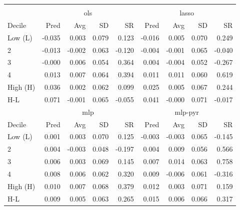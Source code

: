 \begin{tabular}{lrrrrrrrr}
\hline \hline \\ [-1.8ex]
 & \multicolumn{4}{c}{ols} & \multicolumn{4}{c}{lasso} \\
 \cmidrule(lr){2-5} \cmidrule(lr){6-9}
Decile & Pred & Avg & SD & SR & Pred & Avg & SD & SR \\
\midrule
Low (L) & -0.035 & 0.003 & 0.079 & 0.123 & -0.016 & 0.005 & 0.070 & 0.249 \\
2 & -0.013 & -0.002 & 0.063 & -0.120 & -0.004 & -0.001 & 0.065 & -0.040 \\
3 & -0.000 & 0.006 & 0.054 & 0.364 & 0.004 & -0.004 & 0.052 & -0.267 \\
4 & 0.013 & 0.007 & 0.064 & 0.394 & 0.011 & 0.011 & 0.060 & 0.619 \\
High (H) & 0.036 & 0.002 & 0.062 & 0.099 & 0.025 & 0.005 & 0.067 & 0.244 \\
H-L & 0.071 & -0.001 & 0.065 & -0.055 & 0.041 & -0.000 & 0.071 & -0.017 \\
\midrule
 & \multicolumn{4}{c}{mlp} & \multicolumn{4}{c}{mlp-pyr} \\
 \cmidrule(lr){2-5} \cmidrule(lr){6-9}
Decile & Pred & Avg & SD & SR & Pred & Avg & SD & SR \\
\midrule
Low (L) & 0.001 & 0.003 & 0.070 & 0.125 & -0.003 & -0.003 & 0.065 & -0.145 \\
2 & 0.004 & -0.003 & 0.048 & -0.197 & 0.004 & 0.009 & 0.056 & 0.566 \\
3 & 0.006 & 0.003 & 0.069 & 0.145 & 0.007 & 0.014 & 0.063 & 0.758 \\
4 & 0.008 & 0.006 & 0.062 & 0.320 & 0.009 & -0.006 & 0.061 & -0.316 \\
High (H) & 0.010 & 0.007 & 0.068 & 0.379 & 0.012 & 0.003 & 0.071 & 0.159 \\
H-L & 0.009 & 0.005 & 0.063 & 0.265 & 0.015 & 0.006 & 0.066 & 0.317 \\
\hline \hline
\end{tabular}